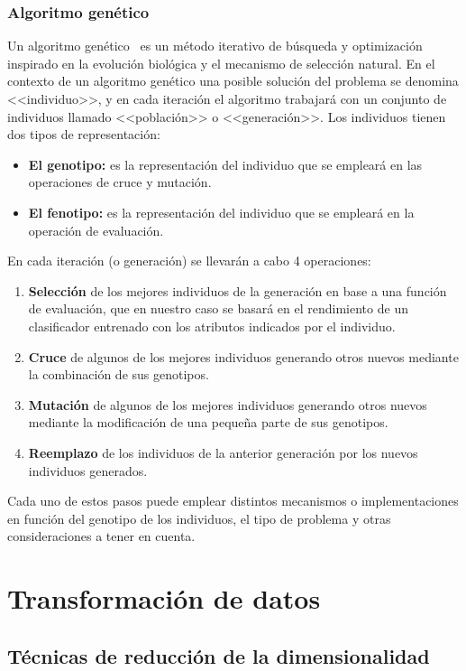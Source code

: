 \subsubsection{Algoritmo genético}

Un algoritmo genético~\cite{koza92} es un método iterativo de búsqueda y optimización inspirado en la evolución biológica y el mecanismo de selección natural. En el contexto de un algoritmo genético una posible solución del problema se denomina <<individuo>>, y en cada iteración el algoritmo trabajará con un conjunto de individuos llamado <<población>> o <<generación>>. Los individuos tienen dos tipos de representación: 
\begin{itemize}
	\item \textbf{El genotipo:} es la representación del individuo que se empleará en las operaciones de cruce y mutación. 
	\item \textbf{El fenotipo:} es la representación del individuo que se empleará en la operación de evaluación. 
\end{itemize}

En cada iteración (o generación) se llevarán a cabo 4 operaciones: 
\begin{enumerate}
	\item \textbf{Selección} de los mejores individuos de la generación en base a una función de evaluación, que en nuestro caso se basará en el rendimiento de un clasificador entrenado con los atributos indicados por el individuo. 
	\item \textbf{Cruce} de algunos de los mejores individuos generando otros nuevos mediante la combinación de sus genotipos. 
	\item\textbf{Mutación} de algunos de los mejores individuos generando otros nuevos mediante la modificación de una pequeña parte de sus genotipos.
	\item \textbf{Reemplazo} de los individuos de la anterior generación por los nuevos individuos generados.  
\end{enumerate}

Cada uno de estos pasos puede emplear distintos mecanismos o implementaciones en función del genotipo de los individuos, el tipo de problema y otras consideraciones a tener en cuenta. 

\section{Transformación de datos}

\subsection{Técnicas de reducción de la dimensionalidad}

